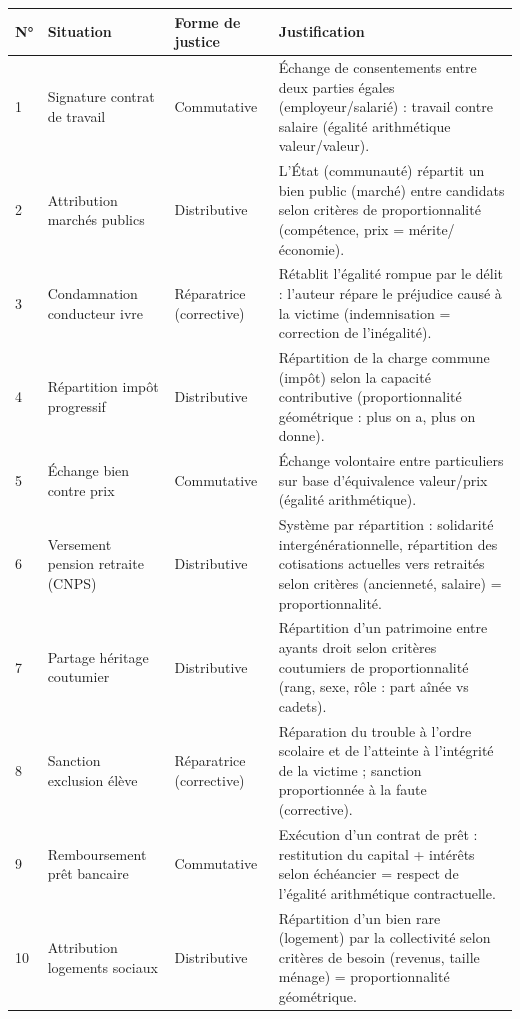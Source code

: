 \documentclass[11pt]{article}
\newcommand{\cle}[1]{{\popxbold\color{popdark}#1}}
\begin{document}
\begin{corrige}
\begin{center}
\begin{tabularx}{\linewidth}{|l|X|l|X|}\hline
\textbf{N°} & \textbf{Situation} & \textbf{Forme de justice} & \textbf{Justification} \\ \hline
1 & Signature contrat de travail & \cle{Commutative} & Échange de consentements entre deux parties égales (employeur/salarié) : travail contre salaire (égalité arithmétique valeur/valeur). \\ \hline
2 & Attribution marchés publics & \cle{Distributive} & L'État (communauté) répartit un bien public (marché) entre candidats selon critères de proportionnalité (compétence, prix = mérite/économie). \\ \hline
3 & Condamnation conducteur ivre & \cle{Réparatrice (corrective)} & Rétablit l'égalité rompue par le délit : l'auteur répare le préjudice causé à la victime (indemnisation = correction de l'inégalité). \\ \hline
4 & Répartition impôt progressif & \cle{Distributive} & Répartition de la charge commune (impôt) selon la capacité contributive (proportionnalité géométrique : plus on a, plus on donne). \\ \hline
5 & Échange bien contre prix & \cle{Commutative} & Échange volontaire entre particuliers sur base d'équivalence valeur/prix (égalité arithmétique). \\ \hline
6 & Versement pension retraite (CNPS) & \cle{Distributive} & Système par répartition : solidarité intergénérationnelle, répartition des cotisations actuelles vers retraités selon critères (ancienneté, salaire) = proportionnalité. \\ \hline
7 & Partage héritage coutumier & \cle{Distributive} & Répartition d'un patrimoine entre ayants droit selon critères coutumiers de proportionnalité (rang, sexe, rôle : part aînée vs cadets). \\ \hline
8 & Sanction exclusion élève & \cle{Réparatrice (corrective)} & Réparation du trouble à l'ordre scolaire et de l'atteinte à l'intégrité de la victime ; sanction proportionnée à la faute (corrective). \\ \hline
9 & Remboursement prêt bancaire & \cle{Commutative} & Exécution d'un contrat de prêt : restitution du capital + intérêts selon échéancier = respect de l'égalité arithmétique contractuelle. \\ \hline
10 & Attribution logements sociaux & \cle{Distributive} & Répartition d'un bien rare (logement) par la collectivité selon critères de besoin (revenus, taille ménage) = proportionnalité géométrique. \\ \hline
\end{tabularx}
\end{center}
\end{corrige}
\end{document}
